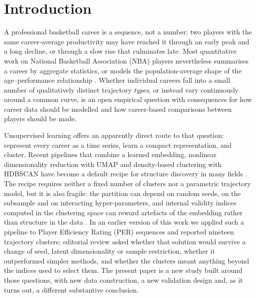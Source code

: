 \section{Introduction}\label{sec:intro}

A professional basketball career is a sequence, not a number: two players with the same career-average productivity may have reached it through an early peak and a long decline, or through a slow rise that culminates late. Most quantitative work on National Basketball Association (NBA) players nevertheless summarises a career by aggregate statistics, or models the population-average shape of the age--performance relationship \citep{vaci2019,kalen2021,xiao2025}. Whether individual careers fall into a small number of qualitatively distinct trajectory \emph{types}, or instead vary continuously around a common curve, is an open empirical question with consequences for how career data should be modelled and how career-based comparisons between players should be made.

Unsupervised learning offers an apparently direct route to that question: represent every career as a time series, learn a compact representation, and cluster. Recent pipelines that combine a learned embedding, nonlinear dimensionality reduction with UMAP \citep{mcinnes2018} and density-based clustering with HDBSCAN \citep{campello2013,campello2015} have become a default recipe for structure discovery in many fields \citep{angelov2020,grootendorst2022,fragkedaki2024}. The recipe requires neither a fixed number of clusters nor a parametric trajectory model, but it is also fragile: the partition can depend on random seeds, on the subsample and on interacting hyper-parameters, and internal validity indices computed in the clustering space can reward artefacts of the embedding rather than structure in the data \citep{chari2023,vonluxburg2010}. In an earlier version of this work we applied such a pipeline to Player Efficiency Rating (PER) sequences and reported nineteen trajectory clusters; editorial review asked whether that solution would survive a change of seed, latent dimensionality or sample restriction, whether it outperformed simpler methods, and whether the clusters meant anything beyond the indices used to select them. The present paper is a new study built around those questions, with new data construction, a new validation design and, as it turns out, a different substantive conclusion.

